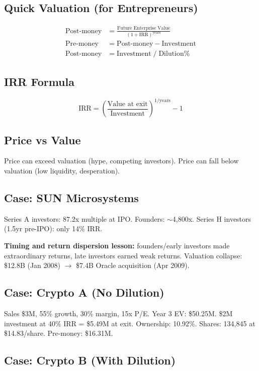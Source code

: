 \documentclass[a4paper,11pt]{article}
\begin{document}
\subsection{Quick Valuation (for Entrepreneurs)}

\begin{align*}
\text{Post-money} &= \frac{\text{Future Enterprise Value}}{(1 + \text{IRR})^{\text{years}}} \\[4pt]
\text{Pre-money} &= \text{Post-money} - \text{Investment} \\[4pt]
\text{Post-money} &= \text{Investment} \;/\; \text{Dilution\%}
\end{align*}

\subsection{IRR Formula}

\[
\text{IRR} = \left(\frac{\text{Value at exit}}{\text{Investment}}\right)^{1/\text{years}} - 1
\]

\subsection{Price vs Value}

Price can exceed valuation (hype, competing investors). Price can fall below valuation (low liquidity, desperation).

\subsection{Case: SUN Microsystems}

Series A investors: 87.2x multiple at IPO. Founders: $\sim$4,800x. Series H investors (1.5yr pre-IPO): only 14\% IRR.

\textbf{Timing and return dispersion lesson:} founders/early investors made extraordinary returns, late investors earned weak returns. Valuation collapse: \$12.8B (Jan 2008) $\rightarrow$ \$7.4B Oracle acquisition (Apr 2009).

\subsection{Case: Crypto A (No Dilution)}

Sales \$3M, 55\% growth, 30\% margin, 15x P/E. Year 3 EV: \$50.25M. \$2M investment at 40\% IRR = \$5.49M at exit. Ownership: 10.92\%. Shares: 134,845 at \$14.83/share. Pre-money: \$16.31M.

\subsection{Case: Crypto B (With Dilution)}
\end{document}
